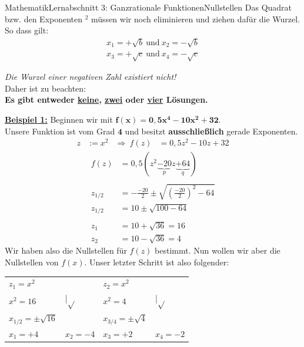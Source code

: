 \documentclass[11pt,twocolumn,oneside,openany,headings=optiontotoc,11pt,numbers=noenddot]{article}
\begin{document}
\begin{worksheet}{Mathematik}{Lernabschnitt 3: Ganzrationale Funktionen}{Nullstellen}
		Das Quadrat bzw. den Exponenten \(^2\) müssen wir noch eliminieren und ziehen dafür die Wurzel. So dass gilt:
		\begin{align*}
			x_1 = +\sqrt{b}\ \text{und}\ x_2=-\sqrt{b}\\
			x_3 = +\sqrt{c}\ \text{und}\ x_4 = -\sqrt{c}
		\end{align*}
		\begin{framed}
			\noindent
			\small{\textit{Die Wurzel einer negativen Zahl existiert nicht!}}\normalsize\\
			Daher ist zu beachten:\\
			\textbf{Es gibt entweder \underline{keine}, \underline{zwei} oder \underline{vier} Lösungen.}
		\end{framed}
		\noindent
		\textbf{\underline{Beispiel 1:}} Beginnen wir mit \(\mathbf{f(x) = 0,5x^4-10x^2+32}\).\\
		Unsere Funktion ist vom Grad \(\mathbf{4}\) und besitzt \textbf{ausschließlich} gerade Exponenten.
		\begin{align*}
			z & := x^2 & \Rightarrow\ f(z) & = 0,5z^2 -10z +32
		\end{align*}
		\begin{align*}			
			f(z) & = 0,5(z^2 \underbrace{-20}_{p}z \underbrace{+64}_{q})\\
			\\
			z_{1/2} & = -\frac{-20}{2} \pm \sqrt{\left(\frac{-20}{2}\right)^2 - 64}\\
			z_{1/2} & = 10 \pm \sqrt{100 - 64}\\
			\\
			z_1 & = 10 + \sqrt{36} = 16\\
			z_2 & = 10 - \sqrt{36} = 4
		\end{align*}
		Wir haben also die Nullstellen für \(f(z)\) bestimmt. Nun wollen wir aber die Nullstellen von \(f(x)\). Unser letzter Schritt ist also folgender:\\
		\par\noindent
		\begin{tabularx}{0.48\textwidth}{Xl|Xl}
			\(z_1 = x^2\) & & \(z_2 = x^2\) &\\
			\(x^2 = 16\) & |\(\sqrt{}\) & \(x^2 = 4\) & |\(\sqrt{}\)\\
			\(x_{1/2} = \pm \sqrt{16}\) & & \(x_{3/4} = \pm \sqrt{4}\)\\
			\colorbox{green!10}{\(x_1 = +4\)} & \colorbox{green!10}{\(x_2 = -4\)} & \colorbox{green!10}{\(x_3 = +2\)} & \colorbox{green!10}{\(x_4 = -2\)}\\
		\end{tabularx}\\

\end{worksheet}
\end{document}
